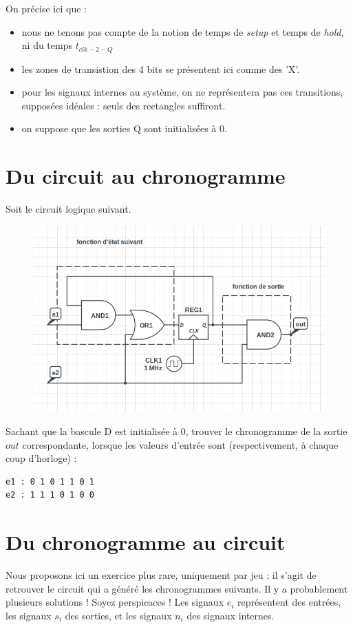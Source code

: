 \documentclass[a4paper,11pt]{article}
\begin{document}
On précise ici que :
\begin{itemize}
\item nous ne tenons pas compte de la notion de temps de {\it setup} et temps de {\it hold}, ni du temps $t_{clk-2-Q}$
\item les zones de transistion des 4 bits se présentent ici comme des 'X'.
\item pour les signaux internes au système, on ne représentera pas ces transitions, supposées idéales : seuls des rectangles suffiront.
\item on suppose que les sorties Q sont initialisées à 0.
\end{itemize}


\section{Du circuit au chronogramme}

Soit le circuit logique suivant.

\begin{figure}[!h]
\begin{center}
\includegraphics[scale=0.3]{./figures/fsm-ex1.png}
\end{center}
\end{figure}

Sachant que la bascule D est initialisée à 0, trouver le chronogramme de la sortie $out$ correspondante, lorsque les valeurs d'entrée sont (respectivement, à chaque coup d'horloge) :

\begin{verbatim}
e1 : 0 1 0 1 1 0 1
e2 : 1 1 1 0 1 0 0
\end{verbatim}

\section{Du chronogramme au circuit}
Nous proposons ici un exercice plus rare, uniquement par jeu : il s'agit de retrouver le circuit qui a généré les chronogrammes suivants. Il y a probablement plusieurs solutions ! Soyez perspicaces ! Les signaux $e_i$ représentent des entrées, les signaux $s_i$ des sorties, et les signaux $n_i$ des signaux internes.
\end{document}
